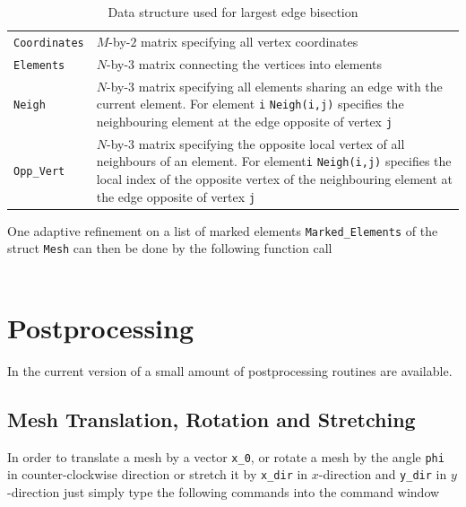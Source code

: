 \begin{table}[htb]
  \begin{tabular}{p{2cm}p{9cm}}
    {\tt Coordinates} & \small $M$-by-$2$ matrix specifying all vertex coordinates            \\
    {\tt Elements}    & \small $N$-by-$3$ matrix connecting the vertices into elements        \\
    {\tt Neigh}       & \small $N$-by-$3$ matrix specifying all elements sharing an edge
                        with the current element. For element {\tt i} {\tt Neigh(i,j)}
                        specifies the neighbouring element at the edge opposite of
                        vertex {\tt j}                                                        \\
    {\tt Opp\_Vert}   & \small $N$-by-$3$ matrix specifying the opposite local vertex of all
                        neighbours of an element. For element{\tt i} {\tt Neigh(i,j)}
                        specifies the local index of the opposite vertex of the
                        neighbouring element at the edge opposite of vertex {\tt j}
  \end{tabular}
  \caption{Data structure used for largest edge bisection}
  \label{tab:MSH_LEB}
\end{table}

One adaptive refinement on a list of marked elements {\tt Marked\_Elements} of the struct {\tt Mesh} can then be done by the
following function call \\

 \\

\section{Postprocessing}

In the current version of \LIBNAME a small amount of postprocessing routines are available.

\subsection{Mesh Translation, Rotation and Stretching}

In order to translate a mesh by a vector {\tt x\_0}, or rotate a mesh by the angle {\tt phi} in counter-clockwise direction
or stretch it by {\tt x\_dir} in $x$-direction and {\tt y\_dir} in $y$-direction just simply type the following commands into
the \MATLAB command window \\

